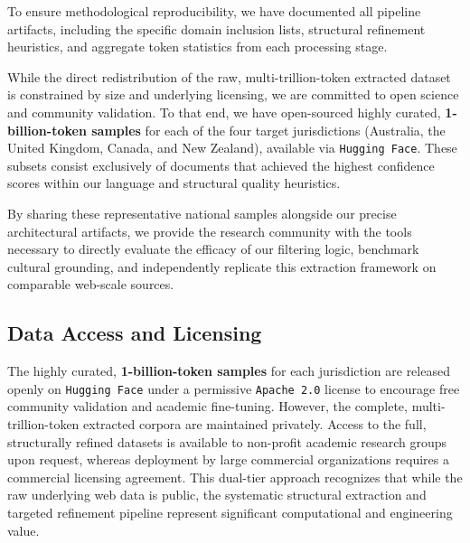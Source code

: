 \documentclass[11pt, a4paper]{article}
\begin{document}
To ensure methodological reproducibility, we have documented all pipeline artifacts, including the specific domain inclusion lists, structural refinement heuristics, and aggregate token statistics from each processing stage.

While the direct redistribution of the raw, multi-trillion-token extracted dataset is constrained by size and underlying licensing, we are committed to open science and community validation. To that end, we have open-sourced highly curated, \textbf{1-billion-token samples} for each of the four target jurisdictions (Australia, the United Kingdom, Canada, and New Zealand), available via \texttt{Hugging Face}. These subsets consist exclusively of documents that achieved the highest confidence scores within our language and structural quality heuristics.

By sharing these representative national samples alongside our precise architectural artifacts, we provide the research community with the tools necessary to directly evaluate the efficacy of our filtering logic, benchmark cultural grounding, and independently replicate this extraction framework on comparable web-scale sources.

\subsection*{Data Access and Licensing}
The highly curated, \textbf{1-billion-token samples} for each jurisdiction are released openly on \texttt{Hugging Face} under a permissive \texttt{Apache 2.0} license to encourage free community validation and academic fine-tuning. However, the complete, multi-trillion-token extracted corpora are maintained privately. Access to the full, structurally refined datasets is available to non-profit academic research groups upon request, whereas deployment by large commercial organizations requires a commercial licensing agreement. This dual-tier approach recognizes that while the raw underlying web data is public, the systematic structural extraction and targeted refinement pipeline represent significant computational and engineering value.
\end{document}

